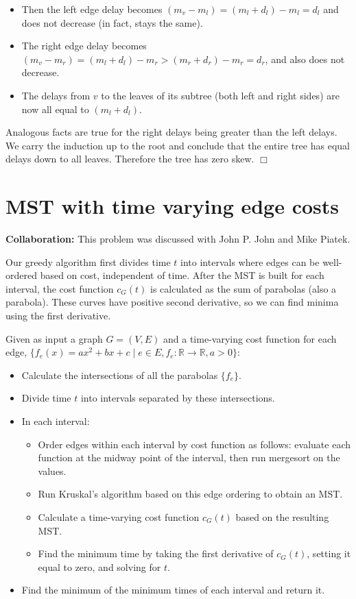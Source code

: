 \documentclass[12pt]{article}
\begin{document}
\begin{itemize}
\item
Then the left edge delay becomes $(m_v - m_l) = (m_l + d_l) - m_l = d_l$
and does not decrease (in fact, stays the same).
\item
The right edge delay becomes $(m_v - m_r) = (m_l + d_l) - m_r > (m_r + d_r) - m_r = d_r$, and also does not decrease.
\item The delays from $v$ to the leaves of its subtree (both left and
right sides) are now all equal to $(m_l + d_l)$.
\end{itemize}

Analogous facts are true for the right delays being greater than
the left delays. We carry the induction up to the root and conclude that
the entire tree has equal delays down to all leaves. Therefore the tree has
zero skew.
$\Box$

\pagebreak

\section{MST with time varying edge costs}

\textbf{Collaboration:} This problem was discussed with John P. John and
Mike Piatek.

Our greedy algorithm first divides time $t$ into intervals where
edges can be well-ordered based on cost, independent of time.
After the MST
is built for each interval, the cost function $c_G(t)$ is calculated as
the sum of parabolas (also a parabola). These curves 
have positive second derivative, so we can find minima using the first
derivative.

Given as input a graph $G=(V,E)$ and a time-varying cost function for each
edge, $\{f_e(x) = ax^2 + bx + c \mid e \in E, f_e:\mathbb{R}\rightarrow\mathbb{R}, a>0\}$:

\begin{itemize}
\item
Calculate the intersections of all the parabolas $\{f_e\}$.
\item
Divide time $t$ into intervals separated by these intersections.
\item
In each interval:
\begin{itemize}
\item
Order edges within each interval by cost function as follows:
evaluate each function at the midway point of the interval,
then run mergesort on the values.
\item
Run Kruskal's algorithm based on this edge ordering to obtain an MST.
\item
Calculate a time-varying cost function $c_G(t)$ based on the resulting MST.
\item
Find the minimum time by taking the first derivative of $c_G(t)$,
setting it equal to zero, and solving for $t$.
\end{itemize}
\item
Find the minimum of the minimum times of each interval and return it.
\end{itemize}
\end{document}
